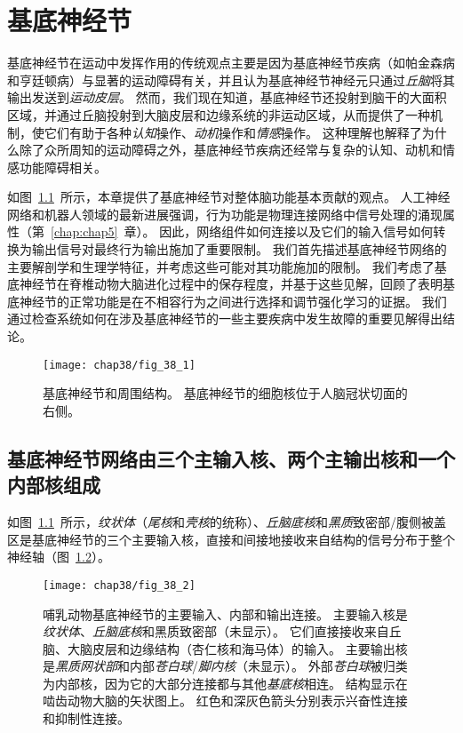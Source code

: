 \chapter{基底神经节} \label{chap:chap38}

基底神经节在运动中发挥作用的传统观点主要是因为基底神经节疾病（如帕金森病和亨廷顿病）与显著的运动障碍有关，并且认为基底神经节神经元只通过\textit{丘脑}将其输出发送到\textit{运动皮层}。
然而，我们现在知道，基底神经节还投射到脑干的大面积区域，并通过丘脑投射到大脑皮层和边缘系统的非运动区域，从而提供了一种机制，使它们有助于各种\textit{认知}操作、\textit{动机}操作和\textit{情感}操作。
这种理解也解释了为什么除了众所周知的运动障碍之外，基底神经节疾病还经常与复杂的认知、动机和情感功能障碍相关。




如图~\ref{fig:38_1}~所示，本章提供了基底神经节对整体脑功能基本贡献的观点。
人工神经网络和机器人领域的最新进展强调，行为功能是物理连接网络中信号处理的涌现属性（第~\ref{chap:chap5}~章）。
因此，网络组件如何连接以及它们的输入信号如何转换为输出信号对最终行为输出施加了重要限制。
我们首先描述基底神经节网络的主要解剖学和生理学特征，并考虑这些可能对其功能施加的限制。
我们考虑了基底神经节在脊椎动物大脑进化过程中的保存程度，并基于这些见解，回顾了表明基底神经节的正常功能是在不相容行为之间进行选择和调节强化学习的证据。
我们通过检查系统如何在涉及基底神经节的一些主要疾病中发生故障的重要见解得出结论。


\begin{figure}[htbp]
	\centering
	\texttt{[image: chap38/fig\_38\_1]}
	\caption{基底神经节和周围结构。
		基底神经节的细胞核位于人脑冠状切面的右侧\cite{nieuwenhuys2007human}。}
	\label{fig:38_1}
\end{figure}



\section{基底神经节网络由三个主输入核、两个主输出核和一个内部核组成}

如图~\ref{fig:38_1}~所示，\textit{纹状体}（\textit{尾核}和\textit{壳核}的统称）、\textit{丘脑底核}和\textit{黑质}致密部/腹侧被盖区是基底神经节的三个主要输入核，直接和间接地接收来自结构的信号分布于整个神经轴（图~\ref{fig:38_2}）。


\begin{figure}[htbp]
	\centering
	\texttt{[image: chap38/fig\_38\_2]}
	\caption{哺乳动物基底神经节的主要输入、内部和输出连接。
		主要输入核是\textit{纹状体}、\textit{丘脑底核}和黑质致密部（未显示）。
		它们直接接收来自丘脑、大脑皮层和边缘结构（杏仁核和海马体）的输入。
		主要输出核是\textit{黑质网状部}和内部\textit{苍白球}/\textit{脚内核}（未显示）。
		外部\textit{苍白球}被归类为内部核，因为它的大部分连接都与其他\textit{基底核}相连。
		结构显示在啮齿动物大脑的矢状图上。
		红色和深灰色箭头分别表示兴奋性连接和抑制性连接。}
	\label{fig:38_2}
\end{figure}



